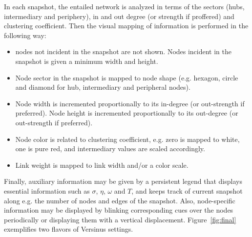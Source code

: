 \documentclass[runningheads]{llncs}
\begin{document}
In each snapshot, the entailed network is analyzed in terms of the sectors (hubs, intermediary and periphery), in and out degree (or strength if proffered) and clustering coefficient. Then the visual mapping of information is performed in the following way:
\begin{itemize}
  \item nodes not incident in the snapshot are not shown. Nodes incident in the snapshot is given a minimum width and height.
  \item Node sector in the snapshot is mapped to node shape (e.g. hexagon, circle and diamond for hub, intermediary and peripheral nodes).
  \item Node width is incremented proportionally to its in-degree (or out-strength if preferred). Node height is incremented proportionally to its out-degree (or out-strength if preferred).
  \item Node color is related to clustering coefficient, e.g. zero is mapped to white, one is pure red, and intermediary values are scaled accordingly.
  \item Link weight is mapped to link width and/or a color scale.
\end{itemize}

Finally, auxiliary information may be given by a persistent legend that displays essential information such as $\sigma$, $\eta$, $\omega$ and $T$, and keeps track of current snapshot along e.g. the number of nodes and edges of the snapshot.
Also, node-specific information may be displayed by blinking corresponding cues over the nodes periodically or displaying them with a vertical displacement.
Figure~\ref{fig:final} exemplifies two flavors of Versinus settings.
\end{document}

